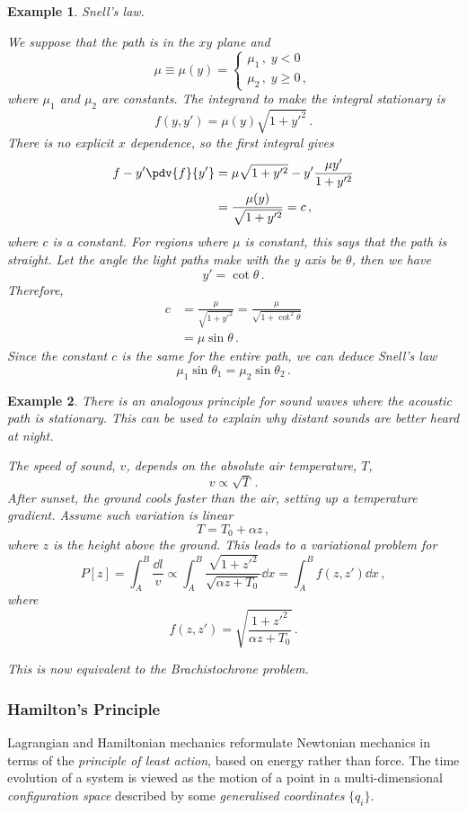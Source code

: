 \documentclass{article}
\theoremstyle{plain}\theoremheaderfont{\normalfont\itshape}\theorembodyfont{\rmfamily}\theoremseparator{.}\newtheorem*{rem}{Remark}\newtheorem*{ex}{Example}\newtheorem*{proof}{Proof}\newtheorem*{altp}{Alternative proof}
\theoremstyle{plain}\theoremheaderfont{\normalfont\bfseries}\theorembodyfont{\rmfamily}\theoremseparator{.}\newtheorem{thm}{Theorem}[section]\newtheorem{lem}[thm]{Lemma}\newtheorem{prop}[thm]{Proposition}\newtheorem*{cor}{Corollary}\newtheorem{defn}[thm]{Definition}\newtheorem{clm}[thm]{Claim}\newtheorem{clminproof}{Claim}
\theoremstyle{break}\theoremheaderfont{\normalfont\itshape}\theorembodyfont{\rmfamily}\theoremseparator{.\medskip}\newtheorem*{proofskip}{Proof}\newtheorem*{exs}{Examples}\newtheorem*{rems}{Remarks}
\theoremstyle{break}\theoremheaderfont{\normalfont\bfseries}\theorembodyfont{\rmfamily}\theoremseparator{.\medskip}\newtheorem{lemskip}[thm]{Lemma}\newtheorem{defnskip}[thm]{Definition}\newtheorem{propskip}[thm]{Proposition}\newtheorem{thmskip}[thm]{Theorem}
\numberwithin{equation}{section}
\begin{document}
	\begin{ex}
		\textit{Snell's law.}
		
		We suppose that the path is in the \(xy\) plane and
		\[\mu\equiv\mu(y)=\begin{cases}
			\mu_1\,,\;y<0\\
			\mu_2\,,\;y\ge 0\,,
		\end{cases}\]
		where \(\mu_1\) and \(\mu_2\) are constants. The integrand to make the integral stationary is
		\[f(y,y')=\mu(y)\sqrt{1+y'^2}\,.\]
		There is no explicit \(x\) dependence, so the first integral gives
		\begin{align*}
			f-y'\pdv{f}{y'}&=\mu\sqrt{1+y'^2}-y'\frac{\mu y'}{1+y'^2}\\
			&=\frac{\mu(y)}{\sqrt{1+y'^2}}=c\,,
		\end{align*}
		where \(c\) is a constant. For regions where \(\mu\) is constant, this says that the path is straight. Let the angle the light paths make with the \(y\) axis be \(\theta\), then we have
		\[y'=\cot\theta\,.\]
		Therefore,
		\begin{align*}
			c&=\frac{\mu}{\sqrt{1+y'^2}}=\frac{\mu}{\sqrt{1+\cot^2\!\theta}}\\
			&=\mu\sin\theta\,.
		\end{align*}
		Since the constant \(c\) is the same for the entire path, we can deduce Snell's law
		\[\mu_1\sin\theta_1=\mu_2\sin\theta_2\,.\]
	\end{ex}
	\begin{ex}
		There is an analogous principle for sound waves where the acoustic path is stationary. This can be used to explain why distant sounds are better heard at night.
		
		The speed of sound, \(v\), depends on the absolute air temperature, \(T\),
		\[v\propto\sqrt{T}\,.\]
		After sunset, the ground cools faster than the air, setting up a temperature gradient. Assume such variation is linear
		\[T=T_0+\alpha z\,,\]
		where \(z\) is the height above the ground. This leads to a variational problem for
		\[P[z]=\int_{A}^{B}\frac{\dd{l}}{v}\propto\int_{A}^{B}\frac{\sqrt{1+z'^2}}{\sqrt{\alpha z+T_0}}\dd{x}=\int_{A}^{B}f(z,z')\dd{x}\,,\]
		where
		\[f(z,z')=\sqrt{\frac{1+z'^2}{\alpha z+T_0}}\,.\]

		This is now equivalent to the Brachistochrone problem.
	\end{ex}
	\subsubsection{Hamilton's Principle}
	Lagrangian and Hamiltonian mechanics reformulate Newtonian mechanics in terms of the \textit{principle of least action}, based on energy rather than force. The time evolution of a system is viewed as the motion of a point in a multi-dimensional \textit{configuration space} described by some \textit{generalised coordinates} \(\{q_i\}\).
\end{document}
